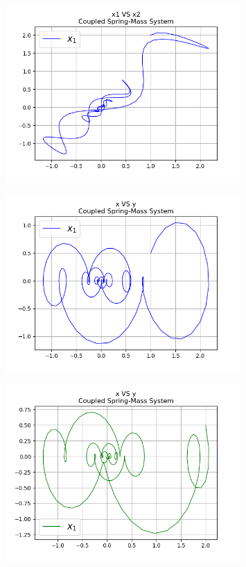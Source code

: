 \documentclass{article}
\begin{document}
\begin{figure}[!ht]
\centering
\includegraphics[width=0.8\textwidth]{two_springs4-2}
\end{figure}
\begin{figure}[!ht]
\centering
\includegraphics[width=0.8\textwidth]{two_springs4-3}
\end{figure}
\begin{figure}[!ht]
\centering
\includegraphics[width=0.8\textwidth]{two_springs4-4}
\end{figure}
\end{document}
